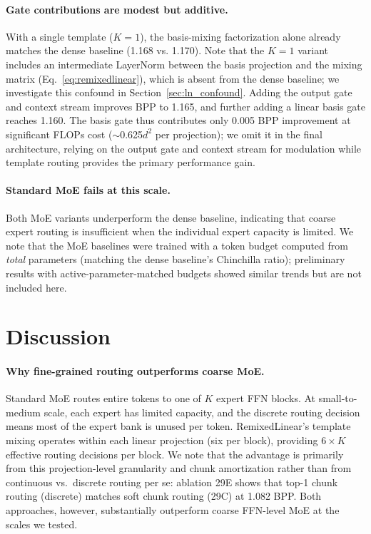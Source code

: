 \documentclass[11pt]{article}
\begin{document}
\paragraph{Gate contributions are modest but additive.} With a single template ($K{=}1$), the basis-mixing factorization alone already matches the dense baseline (1.168 vs. 1.170). Note that the $K{=}1$ variant includes an intermediate LayerNorm between the basis projection and the mixing matrix (Eq.~\ref{eq:remixedlinear}), which is absent from the dense baseline; we investigate this confound in Section~\ref{sec:ln_confound}. Adding the output gate and context stream improves BPP to 1.165, and further adding a linear basis gate reaches 1.160. The basis gate thus contributes only 0.005 BPP improvement at significant FLOPs cost ($\sim$0.625$d^2$ per projection); we omit it in the final architecture, relying on the output gate and context stream for modulation while template routing provides the primary performance gain.

\paragraph{Standard MoE fails at this scale.} Both MoE variants underperform the dense baseline, indicating that coarse expert routing is insufficient when the individual expert capacity is limited. We note that the MoE baselines were trained with a token budget computed from \emph{total} parameters (matching the dense baseline's Chinchilla ratio); preliminary results with active-parameter-matched budgets showed similar trends but are not included here.

\section{Discussion}

\paragraph{Why fine-grained routing outperforms coarse MoE.}
Standard MoE routes entire tokens to one of $K$ expert FFN blocks. At small-to-medium scale, each expert has limited capacity, and the discrete routing decision means most of the expert bank is unused per token. RemixedLinear's template mixing operates within each linear projection (six per block), providing $6 \times K$ effective routing decisions per block. We note that the advantage is primarily from this projection-level granularity and chunk amortization rather than from continuous vs.\ discrete routing per se: ablation 29E shows that top-1 chunk routing (discrete) matches soft chunk routing (29C) at 1.082 BPP. Both approaches, however, substantially outperform coarse FFN-level MoE at the scales we tested.
\end{document}
